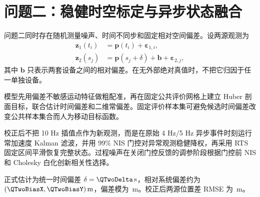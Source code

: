 \section{问题二：稳健时空标定与异步状态融合}

问题二同时存在随机测量噪声、时间不同步和固定相对空间偏差。设两源观测为
\begin{align}
\bm z_1(t_i)&=\bm p(t_i)+\bm\varepsilon_{1,i},\\
\bm z_2(s_j)&=\bm p(s_j+\delta)+\bm b+\bm\varepsilon_{2,j},
\end{align}
其中 $\bm b$ 只表示两套设备之间的相对偏差。在无外部绝对真值时，不把它归因于任一单独设备。

模型先用偏差不敏感运动特征做粗配准，再在固定公共评价网格上建立 Huber 剖面目标，联合估计时间偏差和二维常偏差。固定评价样本集可避免候选时间偏差改变公共样本集合而人为移动目标函数。

校正后不把 10 Hz 插值点作为新观测，而是在原始 4 Hz/5 Hz 异步事件时刻运行常加速度 Kalman 滤波，并用 99\% NIS 门控对异常观测稳健降权，再采用 RTS 固定区间平滑恢复完整状态。过程噪声在关闭门控反馈的调参阶段根据门控前 NIS 和 Cholesky 白化创新相关性选择。

正式估计为统一时间偏差 $\delta=\QTwoDelta\,\mathrm{s}$，相对系统偏差约为 $(\QTwoBiasX,\QTwoBiasY)\,\mathrm{m}$，偏差模为 \QTwoBiasNorm\,m。校正后两源位置差 RMSE 为 \QTwoCorrectedRMSE\,m。


